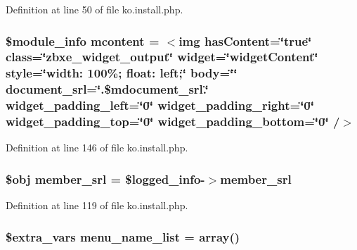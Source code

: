 Definition at line 50 of file ko.\+install.\+php.

\hypertarget{ko_8install_8php_a9da4bb6e77356bb68ae0e05dbd9f5e2f}{}
\subsubsection[{mcontent}]{\setlength{\rightskip}{0pt plus 5cm}\$module\+\_\+info {\bf mcontent} = \textquotesingle{}$<$img has\+Content=\char`\"{}true\char`\"{} class=\char`\"{}zbxe\+\_\+widget\+\_\+output\char`\"{} widget=\char`\"{}widget\+Content\char`\"{} style=\char`\"{}width\+: 100\%; float\+: left;\char`\"{} body=\char`\"{}\char`\"{} document\+\_\+srl=\char`\"{}\textquotesingle{}.\$mdocument\+\_\+srl.\textquotesingle{}\char`\"{} widget\+\_\+padding\+\_\+left=\char`\"{}0\char`\"{} widget\+\_\+padding\+\_\+right=\char`\"{}0\char`\"{} widget\+\_\+padding\+\_\+top=\char`\"{}0\char`\"{} widget\+\_\+padding\+\_\+bottom=\char`\"{}0\char`\"{} /$>$\textquotesingle{}}\label{ko_8install_8php_a9da4bb6e77356bb68ae0e05dbd9f5e2f}


Definition at line 146 of file ko.\+install.\+php.

\hypertarget{ko_8install_8php_aa61f9e08f0fe505094d26f8143f30bbd}{}
\subsubsection[{member\+\_\+srl}]{\setlength{\rightskip}{0pt plus 5cm}\$obj member\+\_\+srl = \$logged\+\_\+info-\/$>$member\+\_\+srl}\label{ko_8install_8php_aa61f9e08f0fe505094d26f8143f30bbd}


Definition at line 119 of file ko.\+install.\+php.

\hypertarget{ko_8install_8php_a9223cf55eb6ff5239c0396968e619fbe}{}
\subsubsection[{menu\+\_\+name\+\_\+list}]{\setlength{\rightskip}{0pt plus 5cm}\${\bf extra\+\_\+vars} menu\+\_\+name\+\_\+list = array()}\label{ko_8install_8php_a9223cf55eb6ff5239c0396968e619fbe}


